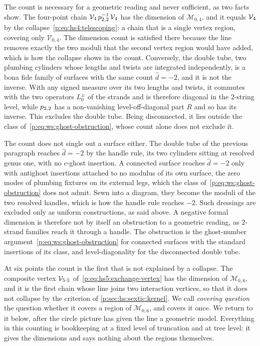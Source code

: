 The count is necessary for a geometric reading and never sufficient, as two facts show.
The four-point chain $\mathcal{V}_{4} \, p_{2,2}^{-1} \, \mathcal{V}_{4}$ has the dimension of $\mathcal M_{0,4}$, and it equals $\mathcal{V}_{4}$ by the collapse~\eqref{p:eq:hs4:telescoping}: a chain that is a single vertex region, covering only $\mathcal V_{0,4}$.
The dimension count is satisfied there because the line removes exactly the two moduli that the second vertex region would have added, which is how the collapse shows in the count.
Conversely, the double tube, two plumbing cylinders whose lengths and twists are integrated independently, is a bona fide family of surfaces with the same count $\hat d = - 2$, and it is not the inverse.
With any signed measure over its two lengths and twists, it commutes with the two operators $L_0^\pm$ of the strands and is therefore diagonal in the $2$-string level, while $p_{2,2}$ has a non-vanishing level-off-diagonal part $R$ and so has its inverse.
This excludes the double tube.
Being disconnected, it lies outside the class of~\eqref{p:eq:ws:ghost-obstruction}, whose count alone does not exclude it.

The count does not single out a surface either.
The double tube of the previous paragraph reaches $\hat d = - 2$ by the handle rule, its two cylinders sitting at resolved genus one, with no $c$-ghost insertion.
A connected surface reaches $\hat d = - 2$ only with antighost insertions attached to no modulus of its own surface, the zero modes of plumbing fixtures on its external legs, which the class of~\eqref{p:eq:ws:ghost-obstruction} does not admit.
Sewn into a diagram, they become the moduli of the two resolved handles, which is how the handle rule reaches $- 2$.
Such dressings are excluded only as uniform constructions, as said above.
A negative formal dimension is therefore not by itself an obstruction to a geometric reading, as $2$-strand families reach it through a handle.
The obstruction is the ghost-number argument~\eqref{p:eq:ws:ghost-obstruction} for connected surfaces with the standard insertions of its class, and level-diagonality for the disconnected double tube.

At six points the count is the first that is not explained by a collapse.
The composite vertex $\mathcal{V}_{5 \cdot 5}$ of~\eqref{p:eq:hs5:exchange-vertex} has the dimension of $\mathcal M_{0,6}$, and it is the first chain whose line joins two interaction vertices, so that it does not collapse by the criterion of \cref{p:sec:hs:sextic:kernel}.
We call \emph{covering question} the question whether it covers a region of $\mathcal M_{0,6}$, and covers it once.
  We return to it below, after the circle picture has given the line a geometric model.
Everything in this counting is bookkeeping at a fixed level of truncation and at tree level: it gives the dimensions and says nothing about the regions themselves.


